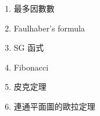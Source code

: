 
\begin{enumerate}
    \normalsize \item 最多因數數 \par
        \tiny 
    \normalsize \item Faulhaber's formula \par
        \tiny 
    \normalsize \item SG 函式 \par
        \tiny 
    \normalsize \item Fibonacci \par
        \tiny 
    \normalsize \item 皮克定理 \par
        \tiny 
    \normalsize \item 連通平面圖的歐拉定理 \par
        \tiny 
\end{enumerate}